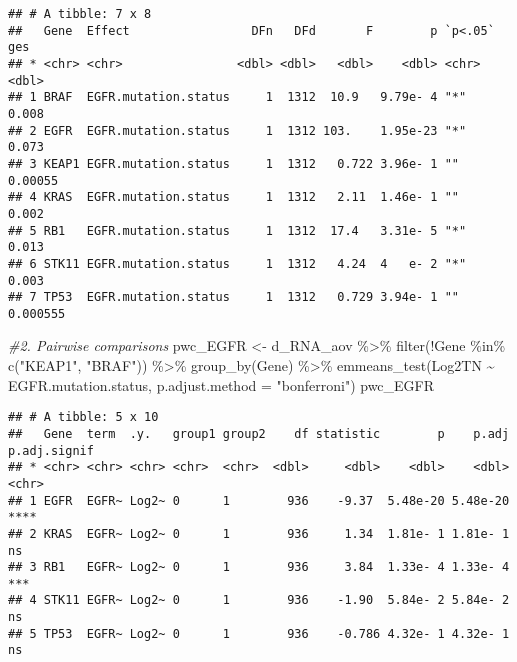 \documentclass[
]{article}
\newenvironment{Shaded}{\begin{snugshade}}{\end{snugshade}}
\newcommand{\AttributeTok}[1]{\textcolor[rgb]{0.77,0.63,0.00}{#1}}
\newcommand{\CommentTok}[1]{\textcolor[rgb]{0.56,0.35,0.01}{\textit{#1}}}
\newcommand{\FunctionTok}[1]{\textcolor[rgb]{0.00,0.00,0.00}{#1}}
\newcommand{\NormalTok}[1]{#1}
\newcommand{\OtherTok}[1]{\textcolor[rgb]{0.56,0.35,0.01}{#1}}
\newcommand{\SpecialCharTok}[1]{\textcolor[rgb]{0.00,0.00,0.00}{#1}}
\newcommand{\StringTok}[1]{\textcolor[rgb]{0.31,0.60,0.02}{#1}}
\begin{document}
\begin{verbatim}
## # A tibble: 7 x 8
##   Gene  Effect                 DFn   DFd       F        p `p<.05`      ges
## * <chr> <chr>                <dbl> <dbl>   <dbl>    <dbl> <chr>      <dbl>
## 1 BRAF  EGFR.mutation.status     1  1312  10.9   9.79e- 4 "*"     0.008   
## 2 EGFR  EGFR.mutation.status     1  1312 103.    1.95e-23 "*"     0.073   
## 3 KEAP1 EGFR.mutation.status     1  1312   0.722 3.96e- 1 ""      0.00055 
## 4 KRAS  EGFR.mutation.status     1  1312   2.11  1.46e- 1 ""      0.002   
## 5 RB1   EGFR.mutation.status     1  1312  17.4   3.31e- 5 "*"     0.013   
## 6 STK11 EGFR.mutation.status     1  1312   4.24  4   e- 2 "*"     0.003   
## 7 TP53  EGFR.mutation.status     1  1312   0.729 3.94e- 1 ""      0.000555
\end{verbatim}

\begin{Shaded}
\begin{Highlighting}[]
\CommentTok{\#2. Pairwise comparisons}
\NormalTok{pwc\_EGFR }\OtherTok{\textless{}{-}}\NormalTok{ d\_RNA\_aov }\SpecialCharTok{\%\textgreater{}\%} 
  \FunctionTok{filter}\NormalTok{(}\SpecialCharTok{!}\NormalTok{Gene }\SpecialCharTok{\%in\%} \FunctionTok{c}\NormalTok{(}\StringTok{"KEAP1"}\NormalTok{, }\StringTok{"BRAF"}\NormalTok{)) }\SpecialCharTok{\%\textgreater{}\%}
  \FunctionTok{group\_by}\NormalTok{(Gene) }\SpecialCharTok{\%\textgreater{}\%}
  \FunctionTok{emmeans\_test}\NormalTok{(Log2TN }\SpecialCharTok{\textasciitilde{}}\NormalTok{ EGFR.mutation.status, }\AttributeTok{p.adjust.method =} \StringTok{"bonferroni"}\NormalTok{) }
\NormalTok{pwc\_EGFR}
\end{Highlighting}
\end{Shaded}

\begin{verbatim}
## # A tibble: 5 x 10
##   Gene  term  .y.   group1 group2    df statistic        p    p.adj p.adj.signif
## * <chr> <chr> <chr> <chr>  <chr>  <dbl>     <dbl>    <dbl>    <dbl> <chr>       
## 1 EGFR  EGFR~ Log2~ 0      1        936    -9.37  5.48e-20 5.48e-20 ****        
## 2 KRAS  EGFR~ Log2~ 0      1        936     1.34  1.81e- 1 1.81e- 1 ns          
## 3 RB1   EGFR~ Log2~ 0      1        936     3.84  1.33e- 4 1.33e- 4 ***         
## 4 STK11 EGFR~ Log2~ 0      1        936    -1.90  5.84e- 2 5.84e- 2 ns          
## 5 TP53  EGFR~ Log2~ 0      1        936    -0.786 4.32e- 1 4.32e- 1 ns
\end{verbatim}
\end{document}
